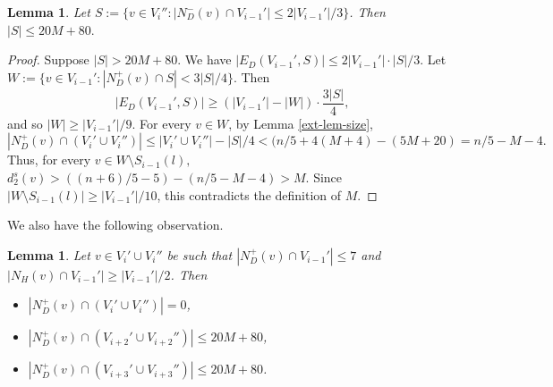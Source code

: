 \documentclass{article}
\newtheorem{lemma}[theorem]{Lemma}
\begin{document}
\begin{lemma}\label{ext-set-S}
 Let $S:=\{v\in V_i'' : |N^-_D(v)\cap V_{i-1}'| \leq 2|V_{i-1}'|/3\}$. Then $|S|\leq 20M+80.$
\end{lemma}
\begin{proof}
Suppose $|S|> 20M+80$. We have $|E_D(V_{i-1}', S)|\leq 2|V_{i-1}'|\cdot  |S|/3$. Let $W:= \{v\in V_{i-1}' : |N^+_D(v)\cap S|<3|S|/4\}$. Then 
$$|E_D(V_{i-1}', S)|\geq (|V_{i-1}'|-|W|)\cdot \frac{3|S|}{4}, $$
and so $|W|\geq |V_{i-1}'|/9$. For every $v\in W$, by Lemma \ref{ext-lem-size}, 
$$|N^+_D(v)\cap (V_i'\cup V_i'')|\leq |V_{i}'\cup V_{i}''|- |S|/4< (n/5+4(M+4) -(5M+20) = n/5- M- 4.$$
Thus, for every $v\in W\setminus S_{i-1}(l),$ $d^s_2(v)> ((n+6)/5-5)-(n/5-M-4)>M$. Since $|W\setminus S_{i-1}(l)|\geq |V_{i-1}'|/10$, this contradicts the definition of $M$.
\end{proof}
We also have the following observation.
\begin{lemma}\label{ext-lem-Mdegs} Let $v\in V_{i}'\cup V_i''$ be such that $|N^+_D(v)\cap V_{i-1}'|\leq 7$ and $|N_H(v)\cap V_{i-1}'|\geq |V_{i-1}'|/2$. Then
\begin{itemize}
    \item[(a)] $|N^+_D(v)\cap (V_{i}'\cup V_i'')|=0$,
    \item[(b)] $|N^+_D(v)\cap (V_{i+2}'\cup V_{i+2}'')|\leq 20M+80$,
    \item[(c)] $|N^+_D(v)\cap (V_{i+3}'\cup V_{i+3}'')|\leq 20M+80$.
\end{itemize}
\end{lemma}
\end{document}
